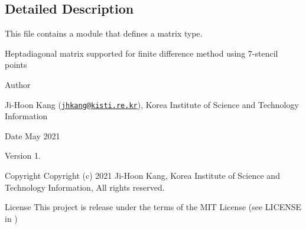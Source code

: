 \subsection{Detailed Description}
This file contains a module that defines a matrix type. 

Heptadiagonal matrix supported for finite difference method using 7-\/stencil points \begin{DoxyAuthor}{Author}

\begin{DoxyItemize}
\item Ji-\/\+Hoon Kang (\href{mailto:jhkang@kisti.re.kr}{\tt jhkang@kisti.\+re.\+kr}), Korea Institute of Science and Technology Information
\end{DoxyItemize}
\end{DoxyAuthor}
\begin{DoxyDate}{Date}
May 2021 
\end{DoxyDate}
\begin{DoxyVersion}{Version}
1. 
\end{DoxyVersion}
\begin{DoxyParagraph}{Copyright}
Copyright (c) 2021 Ji-\/\+Hoon Kang, Korea Institute of Science and Technology Information, All rights reserved. 
\end{DoxyParagraph}
\begin{DoxyParagraph}{License }
This project is release under the terms of the M\+IT License (see L\+I\+C\+E\+N\+SE in ) 
\end{DoxyParagraph}
